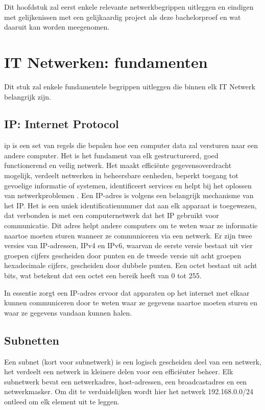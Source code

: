 Dit hoofdstuk zal eerst enkele relevante netwerkbegrippen uitleggen en eindigen met gelijkenissen met een gelijkaardig project als deze bachelorproef en wat daaruit kan worden meegenomen.


\section{IT Netwerken: fundamenten}
Dit stuk zal enkele fundamentele begrippen uitleggen die binnen elk IT Netwerk belangrijk zijn.

\subsection{IP: Internet Protocol}
\acrfull{ip} is een set van regels die bepalen hoe een computer data zal versturen naar een andere computer. Het is het fundament van elk gestructureerd, goed functionerend en veilig netwerk. Het maakt efficiënte gegevensoverdracht mogelijk, verdeelt netwerken in beheersbare eenheden, beperkt toegang tot gevoelige informatie of systemen, identificeert services en helpt bij het oplossen van netwerkproblemen \autocite{Postel1981}. Een IP-adres is volgens \textcite{Postel1981} een belangrijk mechanisme van het IP. Het is een uniek identificatienummer dat aan elk apparaat is toegewezen, dat verbonden is met een computernetwerk dat het IP gebruikt voor communicatie. Dit adres helpt andere computers om te weten waar ze informatie naartoe moeten sturen wanneer ze communiceren via een netwerk.
Er zijn twee versies van IP-adressen, IPv4 en IPv6, waarvan de eerste versie bestaat uit vier groepen cijfers gescheiden door punten en de tweede versie uit acht groepen hexadecimale cijfers, gescheiden door dubbele punten. Een octet bestaat uit acht bits, wat betekent dat een octet een bereik heeft van 0 tot 255.

In essentie zorgt een IP-adres ervoor dat apparaten op het internet met elkaar kunnen communiceren door te weten waar ze gegevens naartoe moeten sturen en waar ze gegevens vandaan kunnen halen.

\subsection{Subnetten}
Een subnet (kort voor subnetwerk) is een logisch gescheiden deel van een netwerk, het verdeelt een netwerk in kleinere delen voor een efficiënter beheer. Elk subnetwerk bevat een netwerkadres, host-adressen, een broadcastadres en een netwerkmasker. Om dit te verduidelijken wordt hier het netwerk 192.168.0.0/24 ontleed om elk element uit te leggen.


